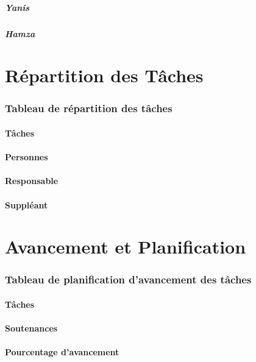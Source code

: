 \documentclass[
	article,			%
	11pt,				%
	oneside,			%
	a4paper,			%
	chapter=TITLE,
	french,			%
	sumario=tradicional
	]{base_nt}
\begin{document}

\subsubsection{Yanis}


\subsubsection{Hamza}


\part{Répartition des Tâches}

\section{Tableau de répartition des tâches}

\subsection{Tâches}

\subsection{Personnes}

\subsection{Responsable}

\subsection{Suppléant}

\part{ Avancement et Planification}

\section{Tableau de planification d'avancement des tâches}

\subsection{Tâches}

\subsection{Soutenances}

\subsection{Pourcentage d'avancement}

\newpage


\end{document}
